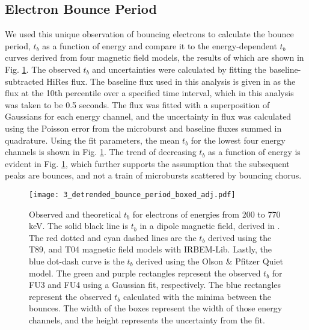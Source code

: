 \subsection{Electron Bounce Period} \label{t_b} %
We used this unique observation of bouncing electrons to calculate the bounce period, $t_b$ as a function of energy and compare it to the energy-dependent $t_b$ curves derived from four magnetic field models, the results of which are shown in Fig. \ref{tb_plot}. The observed $t_b$ and uncertainties were calculated by fitting the baseline-subtracted HiRes flux. The baseline flux used in this analysis is given in \citet{O'Brien2004} as the flux at the 10th percentile over a specified time interval, which in this analysis was taken to be 0.5 seconds. The flux was fitted with a superposition of Gaussians for each energy channel, and the uncertainty in flux was calculated using the Poisson error from the microburst and baseline fluxes summed in quadrature. Using the fit parameters, the mean $t_b$ for the lowest four energy channels is shown in Fig. \ref{tb_plot}. The trend of decreasing $t_b$ as a function of energy is evident in Fig. \ref{tb_plot}, which further supports the assumption that the subsequent peaks are bounces, and not a train of microbursts scattered by bouncing chorus. 

\begin{figure}
\texttt{[image: 3\_detrended\_bounce\_period\_boxed\_adj.pdf]}
\caption{Observed and theoretical $t_b$ for electrons of energies from 200 to 770 keV. The solid black line is $t_b$ in a dipole magnetic field, derived in \citet{Schulz1974}. The red dotted and cyan dashed lines are the $t_b$ derived using the T89, and T04 magnetic field models with IRBEM-Lib. Lastly, the blue dot-dash curve is the $t_b$ derived using the Olson \& Pfitzer Quiet model. The green and purple rectangles represent the observed $t_b$ for FU3 and FU4 using a Gaussian fit, respectively. The blue rectangles represent the observed $t_b$ calculated with the minima between the bounces. The width of the boxes represent the width of those energy channels, and the height represents the uncertainty from the fit.}
\label{tb_plot}
\end{figure}

